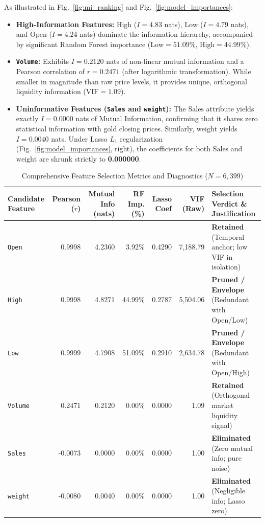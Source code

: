 \documentclass[conference]{IEEEtran}
\begin{document}
As illustrated in Fig.~\ref{fig:mi_ranking} and Fig.~\ref{fig:model_importances}:
\begin{itemize}
    \item \textbf{High-Information Features:} $\text{High}$ ($I = 4.83$ nats), $\text{Low}$ ($I = 4.79$ nats), and $\text{Open}$ ($I = 4.24$ nats) dominate the information hierarchy, accompanied by significant Random Forest importance ($\text{Low} = 51.09\%$, $\text{High} = 44.99\%$).
    \item \textbf{\texttt{Volume}:} Exhibits $I = 0.2120$ nats of non-linear mutual information and a Pearson correlation of $r = 0.2471$ (after logarithmic transformation). While smaller in magnitude than raw price levels, it provides unique, orthogonal liquidity information ($\text{VIF} = 1.09$).
    \item \textbf{Uninformative Features (\texttt{Sales} and \texttt{weight}):} The $\text{Sales}$ attribute yields exactly $I = 0.0000$ nats of Mutual Information, confirming that it shares zero statistical information with gold closing prices. Similarly, $\text{weight}$ yields $I = 0.0040$ nats. Under Lasso $L_1$ regularization (Fig.~\ref{fig:model_importances}, right), the coefficients for both $\text{Sales}$ and $\text{weight}$ are shrunk strictly to \textbf{0.000000}.
\end{itemize}

\begin{table}[t]
\caption{Comprehensive Feature Selection Metrics and Diagnostics ($N = 6{,}399$)}
\label{tab:selection_summary}
\centering
\footnotesize
\setlength{\tabcolsep}{4pt}
\begin{tabular}{lrrrrrl}
\toprule
\textbf{Candidate Feature} & \textbf{Pearson} ($r$) & \textbf{Mutual Info} (nats) & \textbf{RF Imp.} (\%) & \textbf{Lasso Coef} & \textbf{VIF (Raw)} & \textbf{Selection Verdict \& Justification} \\
\midrule
\texttt{Open}   & 0.9998 & 4.2360 & 3.92\%  & 0.4290 & 7,188.79 & \textbf{Retained} (Temporal anchor; low VIF in isolation) \\
\texttt{High}   & 0.9998 & 4.8271 & 44.99\% & 0.2787 & 5,504.06 & \textbf{Pruned / Envelope} (Redundant with Open/Low) \\
\texttt{Low}    & 0.9999 & 4.7908 & 51.09\% & 0.2910 & 2,634.78 & \textbf{Pruned / Envelope} (Redundant with Open/High) \\
\texttt{Volume} & 0.2471 & 0.2120 & 0.00\%  & 0.0000 & 1.09     & \textbf{Retained} (Orthogonal market liquidity signal) \\
\texttt{Sales}  & -0.0073& 0.0000 & 0.00\%  & 0.0000 & 1.00     & \textbf{Eliminated} (Zero mutual info; pure noise) \\
\texttt{weight} & -0.0080& 0.0040 & 0.00\%  & 0.0000 & 1.00     & \textbf{Eliminated} (Negligible info; Lasso zero) \\
\bottomrule
\end{tabular}
\end{table}
\end{document}
